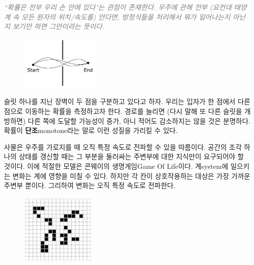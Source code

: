 \documentclass[a4paper,chapter,kosection,atbegshi,hidelinks,itemph]{oblivoir}
\begin{document}
\newpage\pagestyle{hf}

\hfill\parbox[t]{9cm}{\textcolor{gray}{\slshape``확률은 전부 우리 손 안에 있다"는
관점이 존재한다. 우주에 관해 전부 (요컨대 태양계 속 모든 원자의 
위치/속도를) 안다면, 방정식들을 처리해서 뭐가 일어나는지 아닌지
보기만 하면 그만이라는 뜻이다.}}\break

\begin{figure}
    \centering
    \includegraphics[width=0.35\textwidth]{iqis1_001}
\end{figure}

\hfill

슬릿 하나를 지닌 장벽이 두 점을 구분하고 있다고 하자. 우리는 입자가 한 점에서 다른
점으로 이동하는 확률을 측정하고자 한다. 경로를 늘리면 (다시 말해 또 다른 슬릿을 
개방하면) 다른 쪽에 도달할 가능성이 증가, 아니 적어도 감소하지는 않을 것은
분명하다. 확률이 \textbf{단조}{\footnotesize monotone}라는 말로 이런 성질을
가리킬 수 있다.

\hfill
\begin{description}[leftmargin=0cm]
    \item[국소성{\footnotesize Locality}] 
        사물은 우주를 가로지를 때 오직 특정 속도로 전파할 수 있을 따름이다.
        공간의 조각 하나의 상태를 갱신할 때는 그 부분을 둘러싸는 주변부에
        대한 지식만이 요구되어야 할 것이다. 이에 적절한 모델은 콘웨이의
        생명게임{\footnotesize Game Of Life}이다. 계{\footnotesize system}에 
        일으키는 변화는 계에 영향을 미칠 수 있다. 하지만 각 칸이 상호작용하는
        대상은 가장 가까운 주변부 뿐이다. 그리하여 변화는 오직 특정 속도로
        전파한다.
\end{description}

\begin{figure}
    \centering
    \includegraphics[width=0.33\textwidth]{iqis1_002}
\end{figure}
\end{document}
